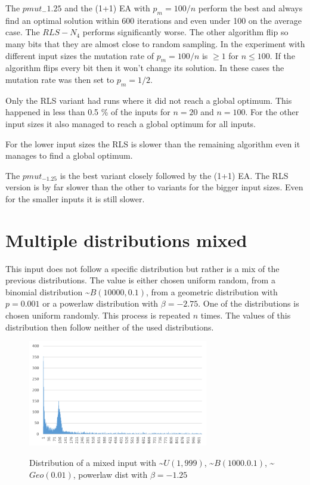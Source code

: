 

The $pmut_-1.25$ and the (1+1) EA with $p_m=100/n$ perform the best and always find an optimal solution within 600 iterations and even under 100 on the average case.
The $RLS-N_4$ performs significantly worse.
The other algorithm flip so many bits that they are almost close to random sampling.
In the experiment with different input sizes the mutation rate of $p_m=100/n$ is $\ge1$ for $n\le100$.
If the algorithm flips every bit then it won't change its solution.
In these cases the mutation rate was then set to $p_m=1/2$.



Only the RLS variant had runs where it did not reach a global optimum.
This happened in less than 0.5 \% of the inputs for $n=20$ and $n=100$.
For the other input sizes it also managed to reach a global optimum for all inputs.



For the lower input sizes the RLS is slower than the remaining algorithm even it manages to find a global optimum.



The $pmut_{-1.25}$ is the best variant closely followed by the (1+1) EA.
The RLS version is by far slower than the other to variants for the bigger input sizes.
Even for the smaller inputs it is still slower.
\section{Multiple distributions mixed}
This input does not follow a specific distribution but rather is a mix of the previous distributions.
The value is either chosen uniform random, from a binomial distribution \textasciitilde$B(10000, 0.1)$, from a geometric distribution with $p=0.001$ or a powerlaw distribution with $\beta=-2.75$.
One of the distributions is chosen uniform randomly.
This process is repeated $n$ times.
The values of this distribution then follow neither of the used distributions.

\begin{figure}[h]
      \caption{Distribution of a mixed input with \textasciitilde$U(1,999)$, \textasciitilde$B(1000.0.1)$, \textasciitilde$Geo(0.01)$, powerlaw dist with $\beta=-1.25$}
      \centering
      \includegraphics[width=0.7\textwidth]{figures/images/numberGenerator/mixed.png}\label{fig:mixedDistExample}
\end{figure}

